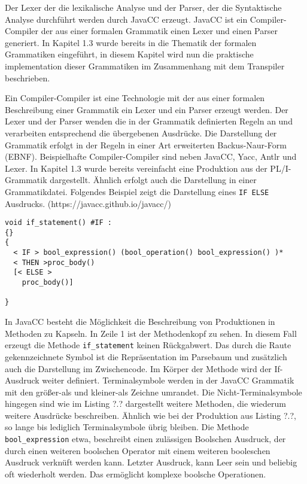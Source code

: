 Der Lexer der die lexikalische Analyse und der Parser, der die Syntaktische Analyse durchführt werden durch JavaCC erzeugt. 
JavaCC ist ein Compiler-Compiler der aus einer formalen Grammatik einen Lexer und einen Parser generiert. 
In Kapitel 1.3 wurde bereits in die Thematik der formalen Grammatiken eingeführt, in diesem Kapitel wird nun die praktische implementation dieser Grammatiken im Zusammenhang mit dem Transpiler beschrieben.

Ein Compiler-Compiler ist eine Technologie mit der aus einer formalen Beschreibung einer Grammatik ein Lexer und ein Parser erzeugt werden. 
Der Lexer und der Parser wenden die in der Grammatik definierten Regeln an und verarbeiten entsprechend die übergebenen Ausdrücke.
Die Darstellung der Grammatik erfolgt in der Regeln in einer Art erweiterten Backus-Naur-Form (EBNF). 
Beispielhafte Compiler-Compiler sind neben JavaCC, Yacc, Antlr und Lexer.
In Kapitel 1.3 wurde bereits vereinfacht eine Produktion aus der PL/I-Grammatik dargestellt. Ähnlich erfolgt auch die Darstellung in einer Grammatikdatei. Folgendes Beispiel zeigt die Darstellung eines \verb+IF ELSE+ Ausdrucks. 
(https://javacc.github.io/javacc/)

\begin{verbatim}
void if_statement() #IF :
{}
{
  < IF > bool_expression() (bool_operation() bool_expression() )*
  < THEN >proc_body()
  [< ELSE >
  	proc_body()]
  	
}
\end{verbatim}

In JavaCC besteht die Möglichkeit die Beschreibung von Produktionen in Methoden zu Kapseln.
In Zeile 1 ist der Methodenkopf zu sehen. In diesem Fall erzeugt die Methode \verb+if_statement+ keinen Rückgabwert.
Das durch die Raute gekennzeichnete Symbol ist die Repräsentation im Parsebaum und zusätzlich auch die Darstellung im Zwischencode.
Im Körper der Methode wird der If-Ausdruck weiter definiert. Terminalsymbole werden in der JavaCC Grammatik mit den größer-als und kleiner-als Zeichne umrandet. Die Nicht-Terminalsymbole hingegen sind wie im Listing ?.? dargestellt weitere Methoden, die wiederum weitere Ausdrücke beschreiben.
Ähnlich wie bei der Produktion aus Listing ?.?, so lange bis lediglich Terminalsymbole übrig bleiben.
Die Methode \verb+bool_expression+ etwa, beschreibt einen zulässigen Boolschen Ausdruck, der durch einen weiteren boolschen Operator mit einem weiteren booleschen Ausdruck verknüft werden kann.
Letzter Ausdruck, kann Leer sein und beliebig oft wiederholt werden. Das ermöglicht komplexe boolsche Operationen.

